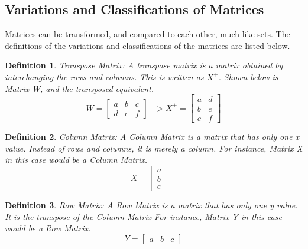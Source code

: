 \documentclass[final,1p,12pt]{elsarticle}
\newtheorem{definition}{Definition}
\begin{document}
    \subsection{Variations and Classifications of Matrices}
    Matrices can be transformed, and compared to each other, much like sets. The definitions of the variations and classifications of the matrices are listed below.
    \begin{definition}Transpose Matrix: 
        A transpose matrix is a matrix obtained by interchanging the rows and columns. This is written as $X^{+}$. Shown below is Matrix W, and the transposed equivalent.
        \begin{equation*}
            W =
            \begin{bmatrix}
                a & b & c \\
                d & e & f
            \end{bmatrix}
            -> X^{+} =
            \begin{bmatrix}
                a & d \\
                b & e \\
                c & f
            \end{bmatrix}
        \end{equation*}
    \end{definition}
        
    \begin{definition}Column Matrix:
        A Column Matrix is a matrix that has only one x value. Instead of rows and columns, it is merely a column. For instance, Matrix X in this case would be a Column Matrix.
        \begin{equation*}%
            X =
            \begin{bmatrix}
                a&\\
                b&\\
                c
            \end{bmatrix}
        \end{equation*}
    \end{definition}
        
    \begin{definition}Row Matrix:
        A Row Matrix is a matrix that has only one y value. It is the transpose of the Column Matrix For instance, Matrix Y in this case would be a Row Matrix.
        \begin{equation*}%
            Y =
            \begin{bmatrix}
                a & b & c
            \end{bmatrix}
        \end{equation*}
    \end{definition}
        
\end{document}
